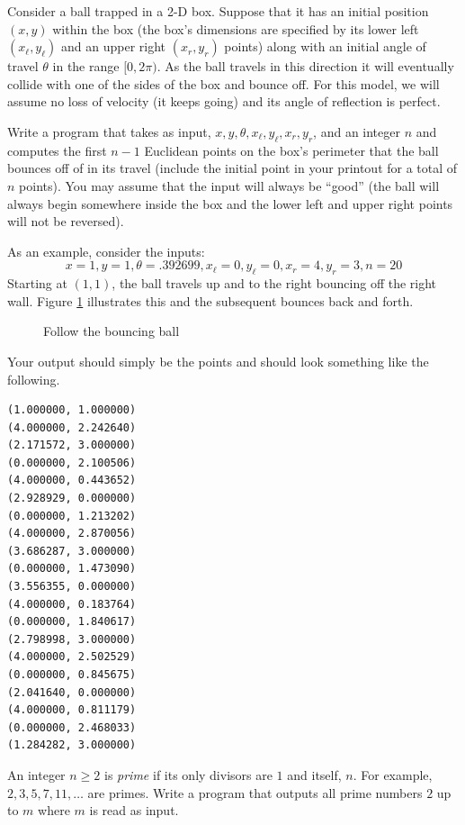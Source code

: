 \begin{exer}
Consider a ball trapped in a 2-D box.  Suppose that it has an initial position $(x, y)$ within the box
(the box's dimensions are specified by its lower left $(x_\ell, y_\ell)$ and an upper right $(x_r, y_r)$ points)
along with an initial angle of travel $\theta$ in the range $[0, 2\pi)$.  As the ball travels in this direction it
will eventually collide with one of the sides of the box and bounce off.  For this model, we will assume no loss of velocity
(it keeps going) and its angle of reflection is perfect.  

Write a program that takes as input, $x, y, \theta, x_\ell, y_\ell, x_r, y_r$, and an integer $n$
and computes the first $n-1$ Euclidean points on the box's perimeter that the ball bounces off of in its
travel (include the initial point in your printout for a total of $n$ points).  You may assume that the input will always be ``good'' (the ball will always begin somewhere inside the box
and the lower left and upper right points will not be reversed).

As an example, consider the inputs: 
$$x = 1, y=1, \theta = .392699, x_\ell = 0, y_\ell = 0, x_r = 4, y_r = 3,  n = 20$$
Starting at $(1, 1)$, the ball travels up and to the right bouncing off the right wall.  Figure 
\ref{fig:bouncyBall} illustrates this and the subsequent bounces back and forth.

\begin{figure}[h]
\centering

\caption{Follow the bouncing ball}
\label{fig:bouncyBall}
\end{figure}

Your output should simply be the points and should look something like the following.

\begin{verbatim}
(1.000000, 1.000000)
(4.000000, 2.242640)
(2.171572, 3.000000)
(0.000000, 2.100506)
(4.000000, 0.443652)
(2.928929, 0.000000)
(0.000000, 1.213202)
(4.000000, 2.870056)
(3.686287, 3.000000)
(0.000000, 1.473090)
(3.556355, 0.000000)
(4.000000, 0.183764)
(0.000000, 1.840617)
(2.798998, 3.000000)
(4.000000, 2.502529)
(0.000000, 0.845675)
(2.041640, 0.000000)
(4.000000, 0.811179)
(0.000000, 2.468033)
(1.284282, 3.000000)
\end{verbatim}

\end{exer}

\begin{exer}
An integer $n \geq 2$ is \emph{prime} if its only divisors are $1$ and itself, $n$.  For example, $2, 3, 5, 7, 11, \ldots$
are primes.  Write a program that outputs all prime numbers $2$ up to $m$ where $m$ is read as input.
\end{exer}

